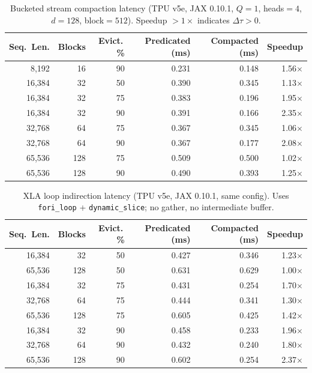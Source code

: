 \documentclass[conference,10pt]{IEEEtran}
\begin{document}
\begin{table}[t]
    \centering
    \caption{Bucketed stream compaction latency (TPU v5e, JAX 0.10.1,
             $Q{=}1$, heads${=}4$, $d{=}128$, block${=}512$). Speedup
             $> 1\times$ indicates $\Delta\tau > 0$.}
    \label{tab:compaction}
    \begin{tabular}{@{}rrrrrr@{}}
        \toprule
        \textbf{Seq.\ Len.} & \textbf{Blocks} & \textbf{Evict.\,\%} & \textbf{Predicated (ms)} & \textbf{Compacted (ms)} & \textbf{Speedup} \\
        \midrule
        8{,}192  & 16  & 90 & 0.231 & 0.148 & 1.56$\times$ \\
        16{,}384 & 32  & 50 & 0.390 & 0.345 & 1.13$\times$ \\
        16{,}384 & 32  & 75 & 0.383 & 0.196 & 1.95$\times$ \\
        16{,}384 & 32  & 90 & 0.391 & 0.166 & 2.35$\times$ \\
        32{,}768 & 64  & 75 & 0.367 & 0.345 & 1.06$\times$ \\
        32{,}768 & 64  & 90 & 0.367 & 0.177 & 2.08$\times$ \\
        65{,}536 & 128 & 75 & 0.509 & 0.500 & 1.02$\times$ \\
        65{,}536 & 128 & 90 & 0.490 & 0.393 & 1.25$\times$ \\
        \bottomrule
    \end{tabular}
\end{table}

\begin{table}[t]
    \centering
    \caption{XLA loop indirection latency (TPU v5e, JAX 0.10.1,
             same config). Uses \texttt{fori\_loop} +
             \texttt{dynamic\_slice}; no gather, no intermediate buffer.}
    \label{tab:loop_indirection}
    \begin{tabular}{@{}rrrrrr@{}}
        \toprule
        \textbf{Seq.\ Len.} & \textbf{Blocks} & \textbf{Evict.\,\%} & \textbf{Predicated (ms)} & \textbf{Compacted (ms)} & \textbf{Speedup} \\
        \midrule
        16{,}384 & 32  & 50 & 0.427 & 0.346 & 1.23$\times$ \\
        65{,}536 & 128 & 50 & 0.631 & 0.629 & 1.00$\times$ \\
        16{,}384 & 32  & 75 & 0.431 & 0.254 & 1.70$\times$ \\
        32{,}768 & 64  & 75 & 0.444 & 0.341 & 1.30$\times$ \\
        65{,}536 & 128 & 75 & 0.605 & 0.425 & 1.42$\times$ \\
        16{,}384 & 32  & 90 & 0.458 & 0.233 & 1.96$\times$ \\
        32{,}768 & 64  & 90 & 0.432 & 0.240 & 1.80$\times$ \\
        65{,}536 & 128 & 90 & 0.602 & 0.254 & 2.37$\times$ \\
        \bottomrule
    \end{tabular}
\end{table}
\end{document}
